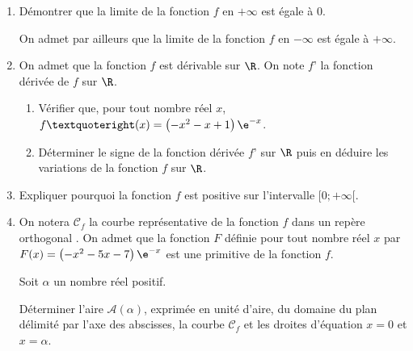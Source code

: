 \begin{enumerate}
\item Démontrer que la limite de la fonction $f$ en $+\infty$ est égale à 0.

On admet par ailleurs que la limite de la fonction $f$ en $-\infty$ est égale à $+\infty$.

\item On admet que la fonction $f$ est dérivable sur $\R$. On note $f’$ la fonction dérivée de $f$ sur $\R$.
	\begin{enumerate}
		\item Vérifier que, pour tout nombre réel $x$, $f’(x)=\left(-x^{2}-x+1\right) \e^{-x}$.
		\item Déterminer le signe de la fonction dérivée $f’$ sur $\R$ puis en déduire les variations de la fonction $f$ sur $\R$.
	\end{enumerate}
\item Expliquer pourquoi la fonction $f$ est positive sur l'intervalle $[0;+\infty[$.
\item On notera $\mathcal{C}_{f}$ la courbe représentative de la fonction $f$ dans un repère orthogonal \Oij. On admet que la fonction $F$ définie pour tout nombre réel $x$ par $F(x)=\left(-x^{2}-5 x-7\right) \e^{-x}$ est une primitive de la fonction $f$.

Soit $\alpha$ un nombre réel positif.

Déterminer l'aire $\mathcal{A}(\alpha)$, exprimée en unité d'aire, du domaine du plan délimité par l'axe des abscisses, la courbe $\mathcal{C}_{f}$ et les droites d'équation $x=0$ et $x=\alpha$.
\end{enumerate}
